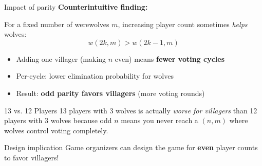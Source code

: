 \documentclass[10pt]{beamer}
\begin{document}
\begin{frame}{Impact of parity}
  \textbf{Counterintuitive finding:}

  For a fixed number of werewolves $m$, increasing player count sometimes \textit{helps} wolves:
  $$w(2k, m) > w(2k-1, m)$$

  \begin{itemize}
    \item Adding one villager (making $n$ even) means \textbf{fewer voting cycles}
    \item Per-cycle: lower elimination probability for wolves
    \item Result: \textbf{odd parity favors villagers} (more voting rounds)
  \end{itemize}

  \vspace{0.5cm}
  \begin{exampleblock}{13 vs. 12 Players}
    13 players with 3 wolves is actually \textit{worse for villagers} than 12 players with 3 wolves because odd $n$ means you never reach a $(n,m)$ where wolves control voting completely.
  \end{exampleblock}

  \begin{alertblock}{Design implication}
    Game organizers can design the game for \textbf{even} player counts to favor villagers!
  \end{alertblock}
\end{frame}
\end{document}
